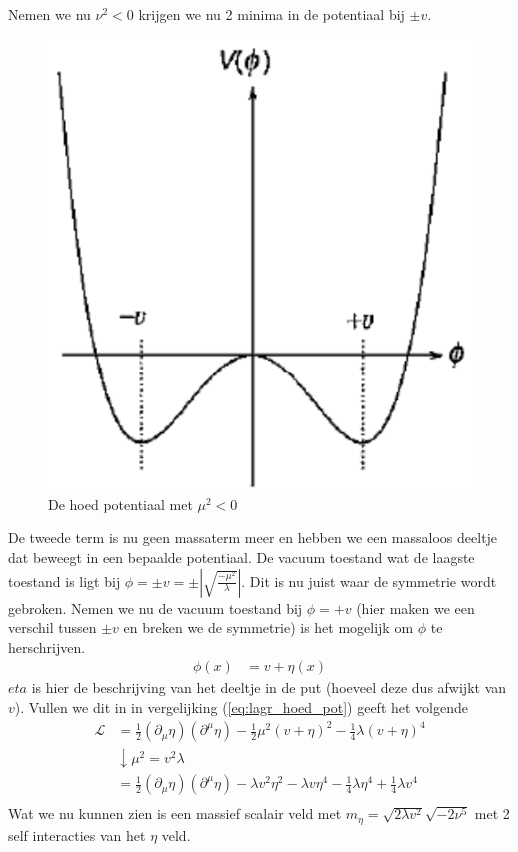 \documentclass[../main.tex]{subfiles}
\begin{document}
Nemen we nu $\nu^2<0$ krijgen we nu 2 minima in de potentiaal bij $\pm v$.

\begin{figure}[h]
    \centering
    \includegraphics[width=0.2\linewidth]{higgs_boson/hoed_pot_2.png}
    \caption{De hoed potentiaal met $\mu^2<0$}%
    \label{fig:higgs_boson/hoed_pot_2}
\end{figure}

De tweede term is nu geen massaterm meer en hebben we een massaloos deeltje dat beweegt in een bepaalde potentiaal. De vacuum toestand wat de laagste toestand is ligt bij $\phi = \pm v = \pm \left| \sqrt{ \frac{-\mu^2}{\lambda}} \right|$. Dit is nu juist waar de symmetrie wordt gebroken. Nemen we nu de vacuum toestand bij $\phi = +v$ (hier maken we een verschil tussen $\pm v$ en breken we de symmetrie) is het mogelijk om $\phi$ te herschrijven.
\begin{equation}
    \begin{aligned}
        \label{eq:veld_symm_breking}
        \phi(x) &= v+\eta(x)
    \end{aligned}
\end{equation}
$eta$ is hier de beschrijving van het deeltje in de put (hoeveel deze dus afwijkt van $v$). Vullen we dit in in vergelijking (\ref{eq:lagr_hoed_pot}) geeft het volgende
\begin{equation}
    \begin{aligned}
        \label{eq:lagr_hoed_pot_symm_breking}
        \mathcal{L} &= \frac{1}{2} (\partial_\mu \eta) (\partial^\mu \eta) - \frac{1}{2} \mu^2 (v+\eta)^2 - \frac{1}{4} \lambda (v+\eta)^4\\
                    &\downarrow \mu^2= v^2\lambda\\
        &= \frac{1}{2} (\partial_\mu \eta) (\partial^\mu \eta) - \lambda v^2\eta^2 - \lambda v \eta^4 - \frac{1}{4} \lambda \eta^4 + \frac{1}{4} \lambda v^4\\
    \end{aligned}
\end{equation}
Wat we nu kunnen zien is een massief scalair veld met $m_\eta = \sqrt{2\lambda v^2}  \sqrt{-2\nu^5}$ met 2 self interacties van het $\eta$ veld.
\end{document}
